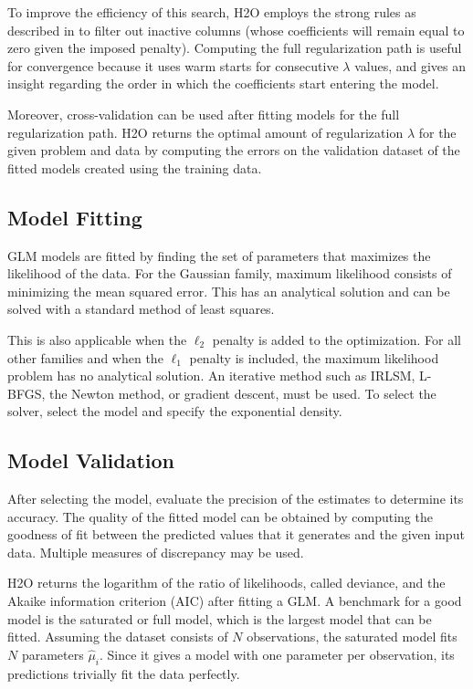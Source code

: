 To improve the efficiency of this search, 
H2O employs the strong rules as described in  to filter out inactive columns (whose coefficients will remain equal to zero given the imposed penalty). Computing the full regularization path is useful for convergence because it uses warm starts for consecutive $\lambda$ values, and gives an insight regarding the order in which the coefficients start entering the model. 

Moreover, cross-validation can be used after fitting models for the full regularization path. H2O returns the optimal amount of regularization $\lambda$ for the given problem and data by computing the errors on the validation dataset of the fitted models created using the training data.

\subsection{Model Fitting}
GLM models are fitted by finding the set of parameters that maximizes the likelihood of the data. For the Gaussian family, maximum likelihood consists of minimizing the mean squared error. This has an analytical solution and can be solved with a standard method of least squares. 

This is also applicable when the $\ell_2$ penalty is added to the optimization.  For all other families and when the $\ell_1$ penalty is included, the maximum likelihood problem has no analytical solution. An iterative method such as IRLSM, L-BFGS, the Newton method, or gradient descent, must be used. To select the solver, select the model and specify the exponential density. 

\subsection{Model Validation}

After selecting the model, evaluate the precision of the estimates to determine its accuracy. The quality of the fitted model can be obtained 
by computing the goodness of fit between the predicted values that it generates and the given input data. Multiple measures of discrepancy may be used. 

H2O returns the logarithm of the ratio of likelihoods, called deviance, and the Akaike information criterion (AIC) after fitting a GLM. A benchmark for a good model is the saturated or full model, which is the largest model that can be fitted. Assuming the dataset consists of $N$ observations, the saturated model fits $N$ parameters $\hat{\mu}_i$. Since it gives a model with one parameter per observation, its predictions trivially fit the data perfectly.

